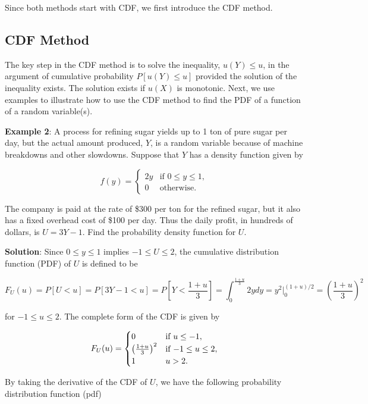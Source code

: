 \documentclass[
]{book}
\begin{document}
Since both methods start with CDF, we first introduce the CDF method.

\hfill\break

\hypertarget{cdf-method}{%
\subsection{CDF Method}\label{cdf-method}}

The key step in the CDF method is to solve the inequality, \(u(Y) \le u\), in the argument of cumulative probability \(P[u(Y) \le u]\) provided the solution of the inequality exists. The solution exists if \(u(X)\) is monotonic. Next, we use examples to illustrate how to use the CDF method to find the PDF of a function of a random variable(s).

\textbf{\color{red}Example 2}: A process for refining sugar yields up to 1 ton of pure sugar per day, but the actual amount produced, \(Y\), is a random variable because of machine breakdowns and other slowdowns. Suppose that \(Y\) has a density function given by

\[
\displaystyle f(y) = \begin{cases} 
 2y & \text{if $0 \le y \le 1$}, \\  
 0 & \text{otherwise}.
 \end{cases}
\]

The company is paid at the rate of \$300 per ton for the refined sugar, but it also has a fixed overhead cost of \$100 per day. Thus the daily profit, in hundreds of dollars, is \(U = 3Y-1\). Find the probability density function for \(U\).

\textbf{Solution}: Since \(0 \le y \le 1\) implies \(-1 \le U \le 2\), the cumulative distribution function (PDF) of \(U\) is defined to be

\[
F_U(u) = P[U < u] = P[3Y-1 < u] = P\left[ Y < \frac{1+u}{3} \right] = \int_{0}^{\frac{1+u}{3}} 2y dy = y^2\bigg|_0^{(1+u)/2}=\left(\frac{1+u}{3}\right)^2   
\]

for \(-1 \le u \le 2\). The complete form of the CDF is given by

\[
\displaystyle F_U(u) = \begin{cases} 
 0 & \text{if $ u \le -1$}, \\  
  \left(\frac{1+u}{3}\right)^2 & \text{if $-1 \le u \le 2$}, \\ 
 1 & \text{$u>2$}.
 \end{cases}
\]

By taking the derivative of the CDF of \(U\), we have the following probability distribution function (pdf)
\end{document}
